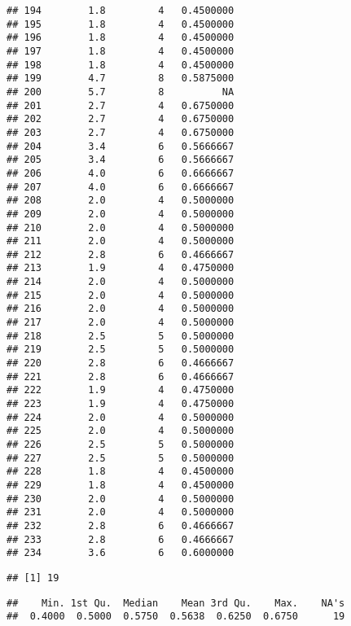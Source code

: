 \documentclass[]{article}
\newenvironment{Shaded}{\begin{snugshade}}{\end{snugshade}}
\newcommand{\DecValTok}[1]{\textcolor[rgb]{0.00,0.00,0.81}{#1}}
\newcommand{\KeywordTok}[1]{\textcolor[rgb]{0.13,0.29,0.53}{\textbf{#1}}}
\newcommand{\NormalTok}[1]{#1}
\newcommand{\OperatorTok}[1]{\textcolor[rgb]{0.81,0.36,0.00}{\textbf{#1}}}
\newcommand{\StringTok}[1]{\textcolor[rgb]{0.31,0.60,0.02}{#1}}
\begin{document}
\begin{verbatim}
## 194        1.8         4   0.4500000
## 195        1.8         4   0.4500000
## 196        1.8         4   0.4500000
## 197        1.8         4   0.4500000
## 198        1.8         4   0.4500000
## 199        4.7         8   0.5875000
## 200        5.7         8          NA
## 201        2.7         4   0.6750000
## 202        2.7         4   0.6750000
## 203        2.7         4   0.6750000
## 204        3.4         6   0.5666667
## 205        3.4         6   0.5666667
## 206        4.0         6   0.6666667
## 207        4.0         6   0.6666667
## 208        2.0         4   0.5000000
## 209        2.0         4   0.5000000
## 210        2.0         4   0.5000000
## 211        2.0         4   0.5000000
## 212        2.8         6   0.4666667
## 213        1.9         4   0.4750000
## 214        2.0         4   0.5000000
## 215        2.0         4   0.5000000
## 216        2.0         4   0.5000000
## 217        2.0         4   0.5000000
## 218        2.5         5   0.5000000
## 219        2.5         5   0.5000000
## 220        2.8         6   0.4666667
## 221        2.8         6   0.4666667
## 222        1.9         4   0.4750000
## 223        1.9         4   0.4750000
## 224        2.0         4   0.5000000
## 225        2.0         4   0.5000000
## 226        2.5         5   0.5000000
## 227        2.5         5   0.5000000
## 228        1.8         4   0.4500000
## 229        1.8         4   0.4500000
## 230        2.0         4   0.5000000
## 231        2.0         4   0.5000000
## 232        2.8         6   0.4666667
## 233        2.8         6   0.4666667
## 234        3.6         6   0.6000000
\end{verbatim}

\begin{Shaded}
\end{Shaded}

\begin{verbatim}
## [1] 19
\end{verbatim}

\begin{Shaded}
\end{Shaded}

\begin{verbatim}
##    Min. 1st Qu.  Median    Mean 3rd Qu.    Max.    NA's 
##  0.4000  0.5000  0.5750  0.5638  0.6250  0.6750      19
\end{verbatim}
\end{document}
